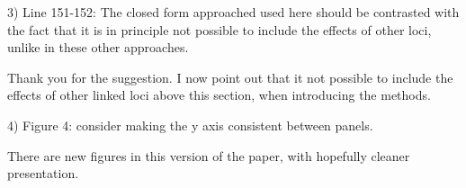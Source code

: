 \documentclass{article}
\newenvironment{response}%
  {\list{}{\leftmargin=0.5in\rightmargin=0.5in\color{blue}}\item[]}%
  {\endlist}
\begin{document}
3) Line 151-152: The closed form approached used here should be contrasted with
the fact that it is in principle not possible to include the effects of other
loci, unlike in these other approaches.

\begin{response}
    Thank you for the suggestion. I now point out that it not possible to include
    the effects of other linked loci above this section, when introducing the
    methods.
\end{response}

4) Figure 4: consider making the y axis consistent between panels.

\begin{response}
    There are new figures in this version of the paper, with hopefully cleaner presentation.
\end{response}
\end{document}
